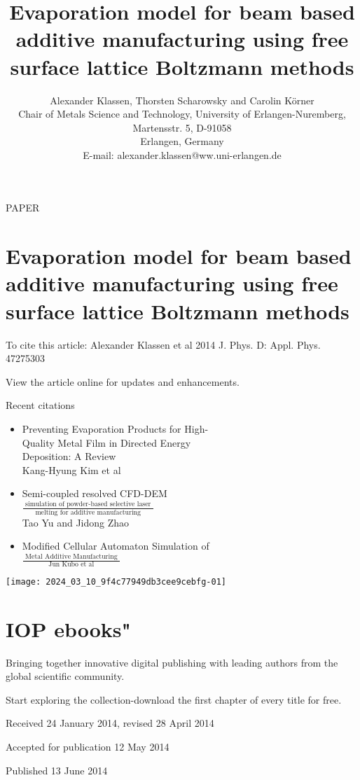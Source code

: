 \documentclass[10pt]{article}
\title{Evaporation model for beam based additive manufacturing using free surface lattice Boltzmann methods }
\author{Alexander Klassen, Thorsten Scharowsky and Carolin Körner\\
Chair of Metals Science and Technology, University of Erlangen-Nuremberg, Martensstr. 5, D-91058\\
Erlangen, Germany\\
E-mail: alexander.klassen@ww.uni-erlangen.de}
\date{}
\begin{document}
\maketitle
PAPER

\section*{Evaporation model for beam based additive manufacturing using free surface lattice Boltzmann methods}
To cite this article: Alexander Klassen et al 2014 J. Phys. D: Appl. Phys. 47275303

View the article online for updates and enhancements.

Recent citations

\begin{itemize}
  \item Preventing Evaporation Products for High-\\
Quality Metal Film in Directed Energy\\
Deposition: A Review\\
Kang-Hyung Kim et al
  \item Semi-coupled resolved CFD-DEM\\
$\frac{\text { simulation of powder-based selective laser }}{\text { melting for additive manufacturing }}$\\
Tao Yu and Jidong Zhao
  \item Modified Cellular Automaton Simulation of\\
$\frac{\text { Metal Additive Manufacturing }}{\text { Jun Kubo et al }}$
\end{itemize}

\begin{center}
\texttt{[image: 2024\_03\_10\_9f4c77949db3cee9cebfg-01]}
\end{center}

\section*{IOP ebooks"}
Bringing together innovative digital publishing with leading authors from the global scientific community.

Start exploring the collection-download the first chapter of every title for free.

Received 24 January 2014, revised 28 April 2014

Accepted for publication 12 May 2014

Published 13 June 2014
\end{document}
